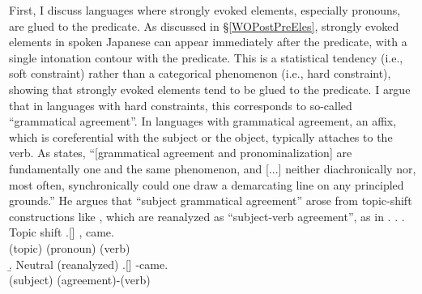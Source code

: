 First, I discuss languages where strongly evoked elements, especially pronouns, are glued to the predicate.
As discussed in \S \ref{WOPostPreEles},
strongly evoked elements in spoken Japanese can appear immediately after the predicate, with a single intonation contour with the predicate.
This is a statistical tendency (i.e., soft constraint) rather than a categorical phenomenon (i.e., hard constraint),
showing that strongly evoked elements tend to be glued to the predicate.
I argue that in languages with hard constraints,
this corresponds to so-called ``grammatical agreement''.
In languages with grammatical agreement,
an affix, which is coreferential with the subject or the object,
typically attaches to the verb.
As  states,
``[grammatical agreement and pronominalization] are fundamentally one and the same phenomenon, and [...] neither diachronically nor, most often, synchronically could one draw a demarcating line on any principled grounds.''
He argues that ``subject grammatical agreement'' arose from topic-shift constructions like \Next[a],
which are reanalyzed as ``subject-verb agreement'', as in \Next[b].
%
\ex.\label{Disc:HardConst:Integrated:Ex:TS}
 \a. Topic shift
 \bg.[] ,  came. \\
        (topic) (pronoun) (verb) \\
 \b. Neutral (reanalyzed)
 \bg.[]  -came. \\
        (subject) (agreement)-(verb) \\
 \hfill{\cite[155]{givon76}}

